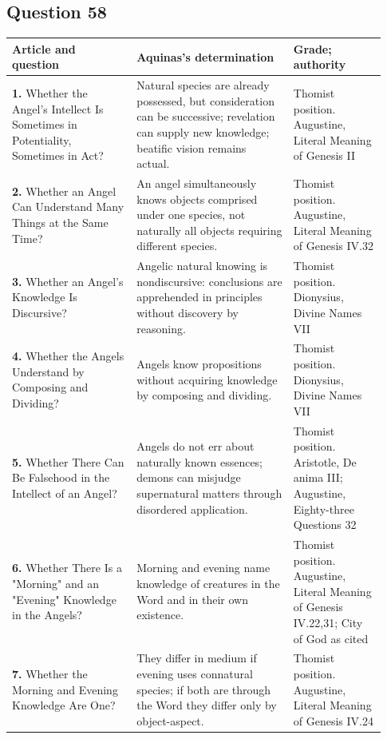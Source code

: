 \subsection{Question 58}
\begin{longtable}{@{}>{\raggedright\arraybackslash}p{0.31\linewidth}>{\raggedright\arraybackslash}p{0.39\linewidth}>{\raggedright\arraybackslash}p{0.23\linewidth}@{}}
\toprule
Article and question & Aquinas's determination & Grade; authority\\
\midrule\endhead
\textbf{1.} Whether the Angel's Intellect Is Sometimes in Potentiality, Sometimes in Act? & Natural species are already possessed, but consideration can be successive; revelation can supply new knowledge; beatific vision remains actual. & Thomist position. Augustine, Literal Meaning of Genesis II\\
\textbf{2.} Whether an Angel Can Understand Many Things at the Same Time? & An angel simultaneously knows objects comprised under one species, not naturally all objects requiring different species. & Thomist position. Augustine, Literal Meaning of Genesis IV.32\\
\textbf{3.} Whether an Angel's Knowledge Is Discursive? & Angelic natural knowing is nondiscursive: conclusions are apprehended in principles without discovery by reasoning. & Thomist position. Dionysius, Divine Names VII\\
\textbf{4.} Whether the Angels Understand by Composing and Dividing? & Angels know propositions without acquiring knowledge by composing and dividing. & Thomist position. Dionysius, Divine Names VII\\
\textbf{5.} Whether There Can Be Falsehood in the Intellect of an Angel? & Angels do not err about naturally known essences; demons can misjudge supernatural matters through disordered application. & Thomist position. Aristotle, De anima III; Augustine, Eighty-three Questions 32\\
\textbf{6.} Whether There Is a "Morning" and an "Evening" Knowledge in the Angels? & Morning and evening name knowledge of creatures in the Word and in their own existence. & Thomist position. Augustine, Literal Meaning of Genesis IV.22,31; City of God as cited\\
\textbf{7.} Whether the Morning and Evening Knowledge Are One? & They differ in medium if evening uses connatural species; if both are through the Word they differ only by object-aspect. & Thomist position. Augustine, Literal Meaning of Genesis IV.24\\
\bottomrule
\end{longtable}
